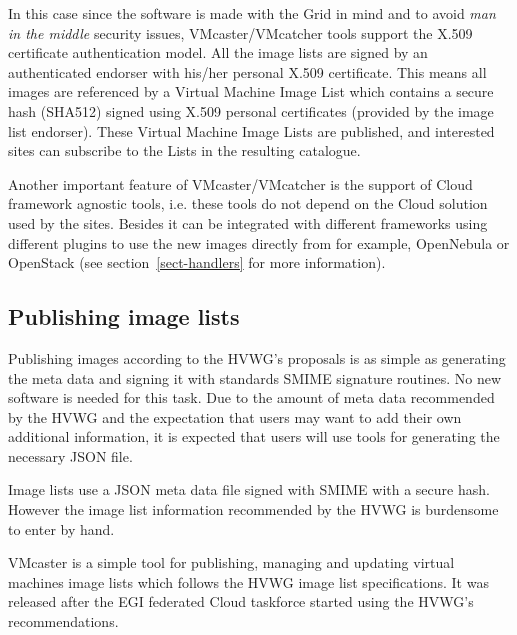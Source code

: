 \documentclass{cai}
\begin{document}
In this case since the software is made with the Grid in mind and to avoid {\it man in the middle} security issues, VMcaster/VMcatcher tools support the X.509 certificate authentication model.
All the image lists are signed by an authenticated endorser with his/her personal X.509 certificate. 
This means all images are referenced by a Virtual Machine Image List which contains a secure hash (SHA512) signed using X.509 personal certificates (provided by the image list endorser). 
These Virtual Machine Image Lists are published, and interested sites can subscribe to the Lists in the resulting catalogue. 

Another important feature of VMcaster/VMcatcher is the support of Cloud framework agnostic tools, i.e. these tools do not depend on the Cloud solution used by the sites. Besides it can be integrated with different frameworks using different plugins to use the new images directly from for example, OpenNebula or OpenStack (see section~\ref{sect-handlers} for more information).



\subsection{Publishing image lists}
Publishing images according to the HVWG's proposals is as simple as generating the meta data and signing it with standards SMIME signature routines. No new software is needed for this task. Due to the amount of meta data recommended by the HVWG and the expectation that users may want to add their own additional information, it is expected that users will use tools for generating the necessary JSON file.

Image lists use a JSON meta data file signed with SMIME  with a secure hash. However the image list information recommended by the HVWG is burdensome to enter by hand.
 
VMcaster is a simple tool for publishing, managing and updating virtual machines image lists which follows the HVWG image list specifications. It was released after the EGI federated Cloud taskforce started using the HVWG's recommendations. 
\end{document}
